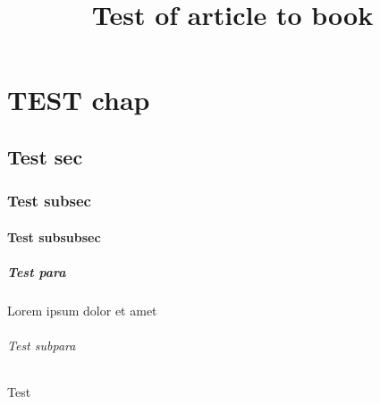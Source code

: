 \documentclass[12pt]{article}
\title{Test of article to book}
\begin{document}
    \tableofcontents
    
    
    
    \chapter{TEST chap}
    \section{Test sec}
    \subsection{Test subsec}
    \subsubsection{Test subsubsec}
    \paragraph{Test para} Lorem ipsum dolor et amet
    \subparagraph{Test subpara}
    Test
\end{document}
